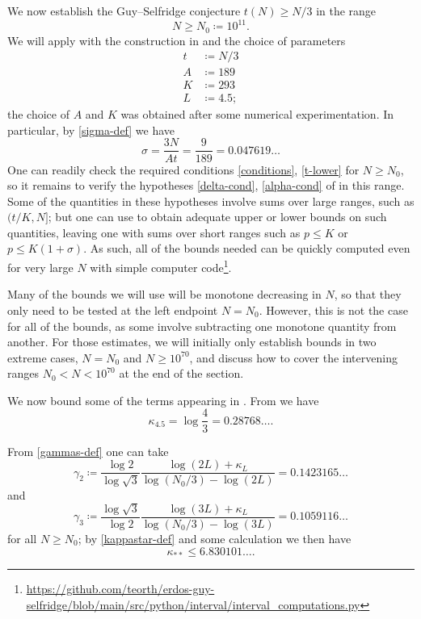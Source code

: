 \documentclass[10pt,a4paper,reqno]{amsart}
\numberwithin{equation}{section}
\theoremstyle{plain}
\theoremstyle{definition}
\begin{document}
We now establish the Guy--Selfridge conjecture $t(N) \geq N/3$ in the range
$$ N \geq N_0 \coloneqq 10^{11}.$$
We will apply  with the construction in  and the choice of parameters
\begin{align*}
  t &\coloneqq N/3\\
  A &\coloneqq 189\\
  K &\coloneqq 293 \\
  L &\coloneqq 4.5;
\end{align*}
the choice of $A$ and $K$ was obtained after some numerical experimentation.  In particular, by \eqref{sigma-def} we have
$$ \sigma = \frac{3N}{At}=\frac{9}{189} =0.047619\dots$$
One can readily check the required conditions \eqref{conditions}, \eqref{t-lower} for $N \geq N_0$, so it remains to verify the hypotheses \eqref{delta-cond}, \eqref{alpha-cond} of  in this range.  Some of the quantities in these hypotheses involve sums over large ranges, such as $(t/K,N]$; but one can use  to obtain adequate upper or lower bounds on such quantities, leaving one with sums over short ranges such as $p \leq K$ or $p \leq K(1+\sigma)$.  As such, all of the bounds needed can be quickly computed even for very large $N$ with simple computer code\footnote{\url{https://github.com/teorth/erdos-guy-selfridge/blob/main/src/python/interval/interval_computations.py}}.

Many of the bounds we will use will be monotone decreasing in $N$, so that they only need to be tested at the left endpoint $N=N_0$.  However, this is not the case for all of the bounds, as some involve subtracting one monotone quantity from another.  For those estimates, we will initially only establish bounds in two extreme cases, $N=N_0$ and $N \geq 10^{70}$, and discuss how to cover the intervening ranges $N_0 < N < 10^{70}$ at the end of the section.

We now bound some of the terms appearing in . From  we have
\begin{equation}\label{kappa-45}
  \kappa_{4.5} = \log \frac{4}{3} =0.28768\dots.
\end{equation}

From \eqref{gammas-def} one can take
$$ \gamma_2 \coloneqq \frac{\log 2}{\log \sqrt{3}} \frac{\log(2L) + \kappa_L}{\log(N_0/3) - \log(2L)} = 0.1423165\dots$$
and
$$\gamma_3 \coloneqq \frac{\log \sqrt{3}}{\log 2} \frac{\log(3L) + \kappa_L}{\log(N_0/3) - \log(3L)} =  0.1059116 \dots$$
for all $N \geq N_0$; by \eqref{kappastar-def} and some calculation we then have
$$ \kappa_{**} \leq 6.830101\dots.$$
\end{document}
